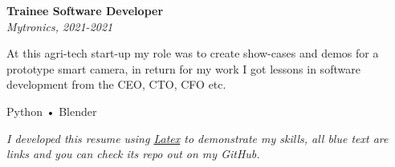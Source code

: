 \documentclass[11pt, twoside, a4paper, titlepage]{article}
\begin{document}
\begin{tcolorbox}[boxsep=0mm, left=0mm, right=0mm, top=0mm, bottom=0mm, height=23cm]
\begin{minipage}[t]{14cm}
\begin{tcolorbox}[grow to left by=0.0cm, colframe=white, colback=white, height=22.9cm]
			\vspace*{0.3cm}
			
			\textbf{Trainee Software Developer}\\
			\emph{Mytronics, 2021-2021}\\
			\parbox{13cm}{At this agri-tech start-up my role was to create show-cases and demos for a prototype smart camera, in return for my work I got lessons in software development from the CEO, CTO, CFO etc.}
			\parbox{13cm}{ Python • Blender }
		\end{tcolorbox}
	\end{minipage}
\end{tcolorbox}

\vspace*{-0.1cm}

\small
\emph{ I developed this resume using \href{https://www.latex-project.org/}{Latex} to demonstrate my skills, all blue text are links and you can check its repo out on my GitHub. }
\end{document}
